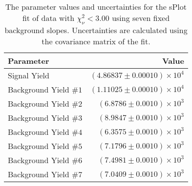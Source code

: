 
\begin{table}[ht]
    \begin{center}
        \begin{tabular}{lr}\toprule
            Parameter & Value \\\midrule
            Signal Yield & $(4.86837 \pm 0.00010) \times 10^{4}$ \\
            Background Yield $\#1$ & $(1.11025 \pm 0.00010) \times 10^{4}$ \\
            Background Yield $\#2$ & $(6.8786 \pm 0.0010) \times 10^{3}$ \\
            Background Yield $\#3$ & $(8.9847 \pm 0.0010) \times 10^{3}$ \\
            Background Yield $\#4$ & $(6.3575 \pm 0.0010) \times 10^{3}$ \\
            Background Yield $\#5$ & $(7.1796 \pm 0.0010) \times 10^{3}$ \\
            Background Yield $\#6$ & $(7.4981 \pm 0.0010) \times 10^{3}$ \\
            Background Yield $\#7$ & $(7.0409 \pm 0.0010) \times 10^{3}$ \\\bottomrule
        \end{tabular}
        \caption{The parameter values and uncertainties for the sPlot fit of data with $\chi^2_\nu < 3.00$ using seven fixed background slopes. Uncertainties are calculated using the covariance matrix of the fit.}\label{tab:splot-fit-results-chisqdof-3.00-fixed-7}
    \end{center}
\end{table}
